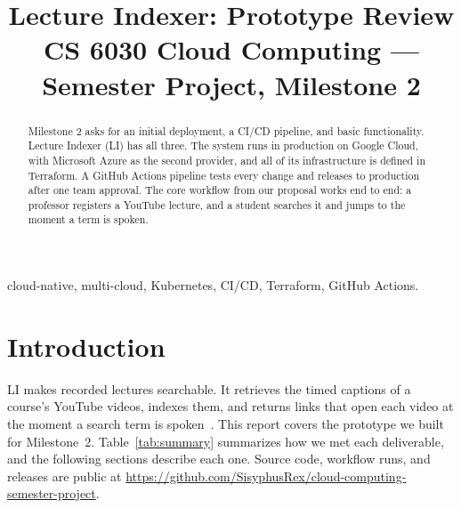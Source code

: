 \documentclass[conference]{IEEEtran}
\newcommand{\repo}{https://github.com/SisyphusRex/cloud-computing-semester-project}
\begin{document}
\title{Lecture Indexer: Prototype Review\\[0.4ex]
{\large CS 6030 Cloud Computing --- Semester Project, Milestone 2}}

\author{
\and
{}
\and
{}
}

\maketitle

\begin{abstract}
Milestone 2 asks for an initial deployment, a CI/CD pipeline, and basic
functionality. Lecture Indexer (LI) has all three. The system runs in
production on Google Cloud, with Microsoft Azure as the second provider,
and all of its infrastructure is defined in Terraform. A GitHub Actions
pipeline tests every change and releases to production after one team
approval. The core workflow from our proposal works end to end: a professor
registers a YouTube lecture, and a student searches it and jumps to the
moment a term is spoken.
\end{abstract}

\begin{IEEEkeywords}
cloud-native, multi-cloud, Kubernetes, CI/CD, Terraform, GitHub Actions.
\end{IEEEkeywords}

\section{Introduction}
LI makes recorded lectures searchable. It retrieves the timed captions of a
course's YouTube videos, indexes them, and returns links that open each
video at the moment a search term is spoken~\cite{m1}. This report covers
the prototype we built for Milestone~2. Table~\ref{tab:summary} summarizes
how we met each deliverable, and the following sections describe each one.
Source code, workflow runs, and releases are public at \url{\repo}.
\end{document}
